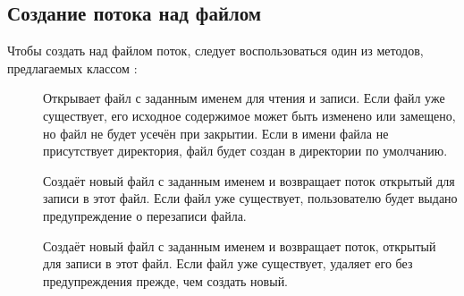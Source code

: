 \documentclass[a4paper,10pt,twoside]{book}
\begin{document}
\subsection{Создание потока над файлом}

Чтобы создать над файлом поток, следует воспользоваться один из методов, предлагаемых классом :

\begin{description}
\item[] Открывает файл с заданным именем для чтения и записи. Если файл уже существует, его исходное содержимое может быть изменено или замещено, но файл не будет усечён при закрытии. Если в имени файла не присутствует директория, файл будет создан в директории по умолчанию. 
\item[] Создаёт новый файл с заданным именем и возвращает поток открытый для записи в этот файл. Если файл уже существует, пользователю будет выдано предупреждение о перезаписи файла. 
\item[] Создаёт новый файл с заданным именем и возвращает поток, открытый для записи в этот файл. Если файл уже существует, удаляет его без предупреждения прежде, чем создать новый. 

\end{description}
\end{document}
